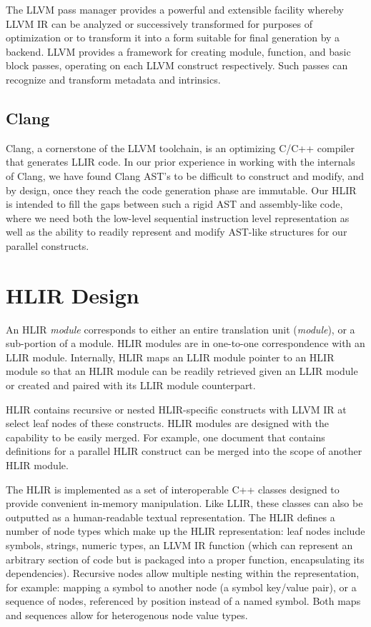 \documentclass[12pt]{article}
\begin{document}
The LLVM pass manager provides a powerful and extensible facility whereby LLVM IR can be analyzed or successively transformed for purposes of optimization or to transform it into a form suitable for final generation by a backend. LLVM provides a framework for creating module, function, and basic block passes, operating on each LLVM construct respectively. Such passes can recognize and transform metadata and intrinsics.

\subsection{Clang}

Clang, a cornerstone of the LLVM toolchain, is an optimizing C/C++ compiler that generates LLIR code. In our prior experience in working with the internals of Clang, we have found Clang AST's to be difficult to construct and modify, and by design, once they reach the code generation phase are immutable. Our HLIR is intended to fill the gaps between such a rigid AST and assembly-like code, where we need both the low-level sequential instruction level representation as well as the ability to readily represent and modify AST-like structures for our parallel constructs.

\section{HLIR Design}

An HLIR {\it module} corresponds to either an entire translation unit ({\it module}), or a sub-portion of a module. HLIR modules are in one-to-one correspondence with an LLIR module. Internally, HLIR maps an LLIR module pointer to an HLIR module so that an HLIR module can be readily retrieved given an LLIR module or created and paired with its LLIR module counterpart.

HLIR contains recursive or nested HLIR-specific constructs with LLVM IR at select leaf nodes of these constructs. HLIR modules are designed with the capability to be easily merged. For example, one document that contains definitions for a parallel HLIR construct can be merged into the scope of another HLIR module.

The HLIR is implemented as a set of interoperable C++ classes designed to provide convenient in-memory manipulation. Like LLIR, these classes can also be outputted as a human-readable textual representation. The HLIR defines a number of node types which make up the HLIR representation: leaf nodes include symbols, strings, numeric types, an LLVM IR function (which can represent an arbitrary section of code but is packaged into a proper function, encapsulating its dependencies). Recursive nodes allow multiple nesting within the representation, for example: mapping a symbol to another node (a symbol key/value pair), or a sequence of nodes, referenced by position
instead of a named symbol. Both maps and sequences allow for heterogenous node value types.
\end{document}
